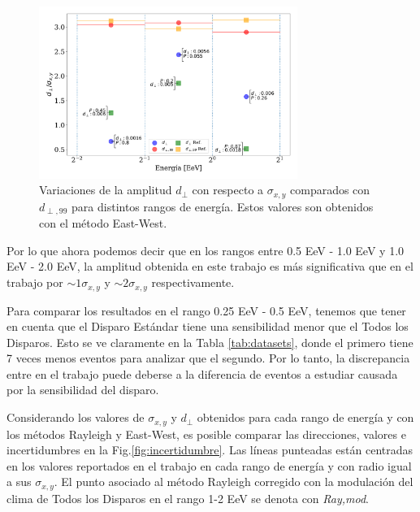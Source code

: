     \begin{figure}[H]
        \begin{small}
            \begin{center}
                \includegraphics[width=0.75\textwidth]{d_perp_normalizado_sigmas_v6.pdf}
            \end{center}
            \caption{Variaciones de la amplitud $d_\perp$ con respecto a $\sigma_{x,y}$ comparados con $d_{\perp,99}$ para distintos rangos de energía. Estos valores son obtenidos con el método East-West. }
            \label{fig:normalizado_sigma}
        \end{small}
    \end{figure}

Por lo que ahora podemos decir que en los rangos entre 0.5 EeV - 1.0 EeV y 1.0 EeV - 2.0 EeV, la amplitud obtenida en este trabajo es más significativa que en el trabajo \cite{Aab_2020} por $\sim 1\sigma_{x,y}$ y $\sim 2 \sigma_{x,y}$ respectivamente.

Para comparar los resultados en el  rango 0.25 EeV - 0.5 EeV, tenemos que tener en cuenta que el Disparo Estándar tiene una sensibilidad menor que el Todos los Disparos. Esto se ve claramente en la Tabla \ref{tab:datasets}, donde el primero tiene 7 veces menos eventos para analizar que el segundo. Por lo tanto, la discrepancia entre en el trabajo \cite{Aab_2020} puede deberse a la  diferencia de eventos a estudiar causada por la sensibilidad del disparo.


Considerando los valores de $\sigma_{x,y}$ y $d_\perp$ obtenidos para cada rango de energía y con los métodos Rayleigh y East-West, es posible  comparar las direcciones, valores e incertidumbres en la Fig.\ref{fig:incertidumbre}. Las líneas punteadas están centradas en los valores reportados en el trabajo \cite{Aab_2020} en cada rango de energía y con radio igual a sus $\sigma_{x,y}$. El punto asociado al método Rayleigh corregido con la modulación del clima de Todos los Disparos en el rango 1-2 EeV se denota con \emph{Ray,mod}.


